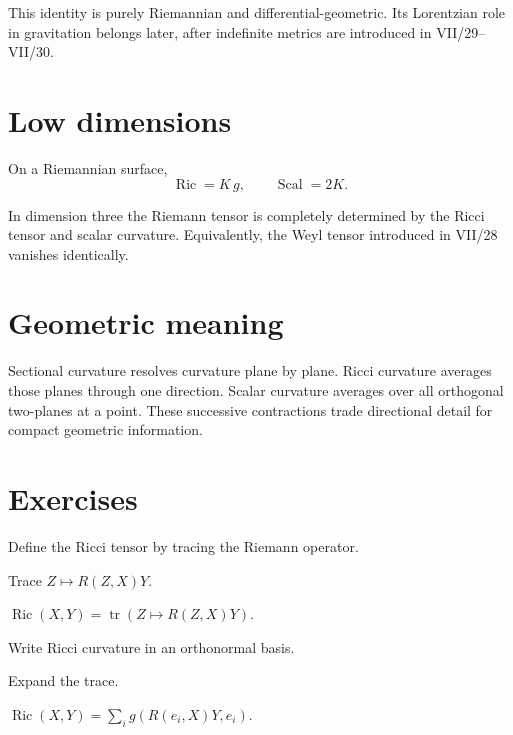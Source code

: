 \begin{remark}
This identity is purely Riemannian and differential-geometric.  Its Lorentzian
role in gravitation belongs later, after indefinite metrics are introduced in
VII/29--VII/30.
\end{remark}

\section{Low dimensions}

\begin{proposition}\label{prop:vii27-dim2}
On a Riemannian surface,
\[
\operatorname{Ric}=K\,g,
\qquad
\operatorname{Scal}=2K.
\]
\end{proposition}

\begin{proposition}\label{prop:vii27-dim3}
In dimension three the Riemann tensor is completely determined by the Ricci tensor
and scalar curvature.  Equivalently, the Weyl tensor introduced in VII/28 vanishes
identically.
\end{proposition}

\section{Geometric meaning}

Sectional curvature resolves curvature plane by plane.  Ricci curvature averages
those planes through one direction.  Scalar curvature averages over all orthogonal
two-planes at a point.  These successive contractions trade directional detail for
compact geometric information.

\section{Exercises}
\begin{exercise}\label{exr:vii27-01}
Define the Ricci tensor by tracing the Riemann operator.
\end{exercise}
\begin{hint}
Trace \(Z\mapsto R(Z,X)Y\).
\end{hint}
\begin{solution}
\(\operatorname{Ric}(X,Y)=\operatorname{tr}(Z\mapsto R(Z,X)Y)\).
\end{solution}

\begin{exercise}\label{exr:vii27-02}
Write Ricci curvature in an orthonormal basis.
\end{exercise}
\begin{hint}
Expand the trace.
\end{hint}
\begin{solution}
\(\operatorname{Ric}(X,Y)=\sum_i g(R(e_i,X)Y,e_i)\).
\end{solution}

